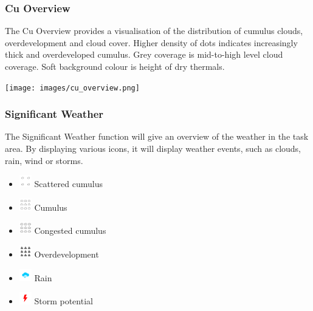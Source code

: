\documentclass[11pt,a4paper]{article}
\begin{document}

\subsubsection{Cu Overview}\label{subsec:cu_overview}
The Cu Overview provides a visualisation of the distribution of cumulus clouds, overdevelopment and cloud cover. Higher density of dots indicates increasingly thick and overdeveloped cumulus. Grey coverage is mid-to-high level cloud coverage. Soft background colour is height of dry thermals. 
\begin{center}
\texttt{[image: images/cu\_overview.png]}
\end{center}

\subsubsection{Significant Weather}\label{subsec:sigweather}
The Significant Weather function will give an overview of the weather in the task area. By displaying various icons, it will display weather events, such as clouds, rain, wind or storms.
\begin{itemize}
\item \includegraphics[height=15pt]{images/icons/cu-1.png} Scattered cumulus
\item \includegraphics[height=15pt]{images/icons/cu-2.png} Cumulus
\item \includegraphics[height=15pt]{images/icons/cu-od-3.png} Congested cumulus
\item \includegraphics[height=15pt]{images/icons/cu-od-4.png} Overdevelopment
\item \includegraphics[height=15pt]{images/icons/cu-rain-7.png} Rain
\item \includegraphics[height=15pt]{images/icons/cu-storm-6.png} Storm potential
\end{itemize}
\end{document}
